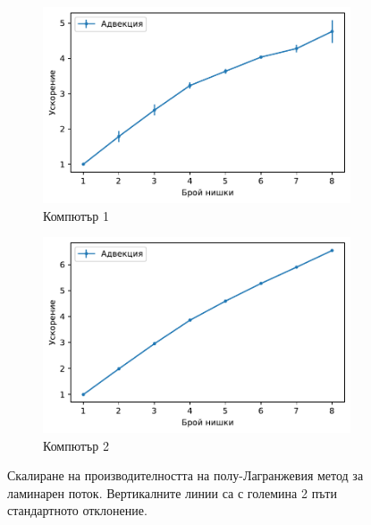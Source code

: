 \documentclass[12pt]{report}
\begin{document}
\begin{figure}[H]
  \centering
  \begin{subfigure}[b]{0.49\textwidth}
      \centering
      \includegraphics[width=\textwidth]{Figures/BG/LaminarAdvectionSpeedUpC1.pdf}
      \caption{Компютър 1}
  \end{subfigure}
  \begin{subfigure}[b]{0.49\textwidth}
      \centering
      \includegraphics[width=\textwidth]{Figures/BG/LaminarAdvectionSpeedUpC2.pdf}
      \caption{Компютър 2}
  \end{subfigure}
\caption{Скалиране на производителността на полу-Лагранжевия метод за ламинарен поток. Вертикалните линии са с големина 2 пъти стандартното отклонение.}\label{fig:advection_speedup_graph_laminar}
\end{figure}
\end{document}
